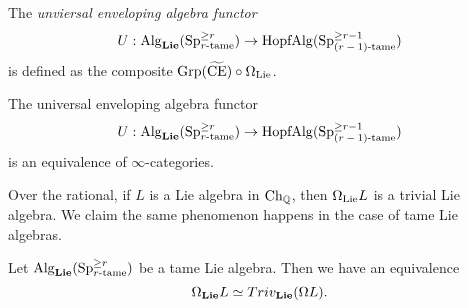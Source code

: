 \begin{definition}
	The \emph{unviersal enveloping algebra functor}
	$$
	U: \operatorname{Alg}_{\mathbf{Lie}}(\operatorname{Sp}^{\geq r}_{\text{$r$-tame}}) 
	\to 
	\operatorname{HopfAlg}(\operatorname{Sp}^{\geq r-1}_{\text{($r-1$)-tame}})
	$$
	is defined as the composite $\operatorname{Grp}(\widetilde{\operatorname{CE}}) \circ \Omega_{\operatorname{Lie}}$.
\end{definition}

	
\begin{theorem}
\label{first main theorem}
	The universal enveloping algebra functor
	$$
	U: \operatorname{Alg}_{\mathbf{Lie}}(\operatorname{Sp}^{\geq r}_{\text{$r$-tame}})  
	\to
	\operatorname{HopfAlg}(\operatorname{Sp}^{\geq r-1}_{\text{($r-1$)-tame}})
	$$
	is an equivalence of $\infty$-categories.
\end{theorem}

Over the rational, if $L$ is a Lie algebra in $\operatorname{Ch}_{{\mathbb{Q}}}$, then $\Omega_{\operatorname{Lie}}L$ is a trivial Lie algebra.
We claim the same phenomenon happens in the case of tame Lie algebras.

\begin{proposition}
\label{Triviality of loop of an O-algebra}
	Let $\operatorname{Alg}_{\mathbf{Lie}}(\operatorname{Sp}^{\geq r}_{\text{$r$-tame}}) $ be a tame Lie algebra.
	Then we have an equivalence
	$$
	\Omega_{\mathbf{Lie}} L\simeq Triv_{\mathbf{Lie}}(\Omega L).
	$$ 
\end{proposition}

